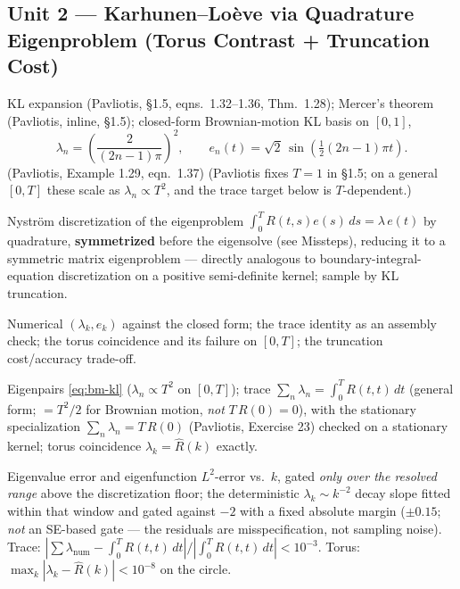 \documentclass[11pt]{article}
\newcommand{\pav}[1]{{\small\color{hubblue}(Pavliotis, #1)}}
\newenvironment{unitmeta}{%
  \begin{description}[style=sameline,leftmargin=1.4cm,font=\bfseries\color{hubblue}]
}{%
  \end{description}
}
\begin{document}
\subsection*{Unit 2 --- Karhunen--Lo\`eve via Quadrature Eigenproblem (Torus Contrast + Truncation Cost)}
\begin{unitmeta}
\item[Concept] KL expansion \pav{\S1.5, eqns.~1.32--1.36, Thm.~1.28}; Mercer's theorem \pav{inline, \S1.5}; closed-form Brownian-motion KL basis on $[0,1]$,
\begin{equation}
\lambda_n = \left(\frac{2}{(2n-1)\pi}\right)^{2}, \qquad e_n(t) = \sqrt{2}\,\sin\!\left(\tfrac{1}{2}(2n-1)\pi t\right).
\label{eq:bm-kl}
\end{equation}
\pav{Example 1.29, eqn.~1.37} (Pavliotis fixes $T=1$ in \S1.5; on a general $[0,T]$ these scale as $\lambda_n \propto T^2$, and the trace target below is $T$-dependent.)
\item[Build] Nystr\"om discretization of the eigenproblem $\int_0^T R(t,s)e(s)\,ds = \lambda\, e(t)$ by quadrature, \textbf{symmetrized} before the eigensolve (see Missteps), reducing it to a symmetric matrix eigenproblem --- directly analogous to boundary-integral-equation discretization on a positive semi-definite kernel; sample by KL truncation.
\item[Check] Numerical $(\lambda_k,e_k)$ against the closed form; the trace identity as an assembly check; the torus coincidence and its failure on $[0,T]$; the truncation cost/accuracy trade-off.
\item[Analytic target] Eigenpairs \eqref{eq:bm-kl} ($\lambda_n\propto T^2$ on $[0,T]$); trace $\sum_n\lambda_n = \int_0^T R(t,t)\,dt$ (general form; $=T^2/2$ for Brownian motion, \emph{not} $T\,R(0)=0$), with the stationary specialization $\sum_n\lambda_n=T\,R(0)$ \pav{Exercise 23} checked on a stationary kernel; torus coincidence $\lambda_k=\hat R(k)$ exactly.
\item[Pass/fail] Eigenvalue error and eigenfunction $L^2$-error vs.\ $k$, gated \emph{only over the resolved range} above the discretization floor; the deterministic $\lambda_k\sim k^{-2}$ decay slope fitted within that window and gated against $-2$ with a fixed absolute margin ($\pm0.15$; \emph{not} an SE-based gate --- the residuals are misspecification, not sampling noise). Trace: $|\sum\lambda_{\text{num}}-\int_0^T R(t,t)\,dt|/|\!\int_0^T R(t,t)\,dt| < 10^{-3}$. Torus: $\max_k|\lambda_k-\hat R(k)| < 10^{-8}$ on the circle.

\end{unitmeta}
\end{document}
